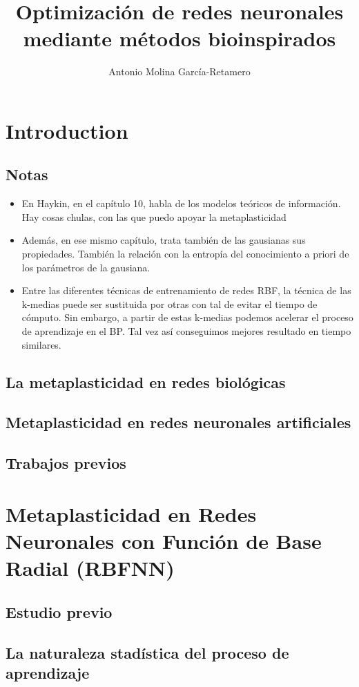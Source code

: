 \documentclass[10pt,a4paper, twocolumn]{report}
\author{Antonio Molina García-Retamero}
\title{Optimización de redes neuronales mediante métodos bioinspirados}
\begin{document}
\onecolumn
\maketitle
\pagebreak
\tableofcontents
\pagebreak
\twocolumn

\chapter{Introduction}
\section{Notas}
\begin{itemize}
	\item En Haykin, en el capítulo 10, habla de los modelos teóricos de información. Hay cosas chulas, con las que puedo apoyar la metaplasticidad
	 \item Además, en ese mismo capítulo, trata también de las gausianas sus propiedades. También la relación con la entropía del conocimiento a priori de los parámetros de la gausiana.
	 \item Entre las diferentes técnicas de entrenamiento de redes RBF, la técnica de las k-medias puede ser sustituida por otras con tal de evitar el tiempo de cómputo. Sin embargo, a partir de estas k-medias podemos acelerar el proceso de aprendizaje en el BP. Tal vez así conseguimos mejores resultado en tiempo similares.
\end{itemize}

\section{La metaplasticidad en redes biológicas}
\section{Metaplasticidad en redes neuronales artificiales}
\section{Trabajos previos}
\chapter{Metaplasticidad en Redes Neuronales con Función de Base Radial (RBFNN)}
\section{Estudio previo}
\section{La naturaleza stadística del proceso de aprendizaje}
\end{document}

